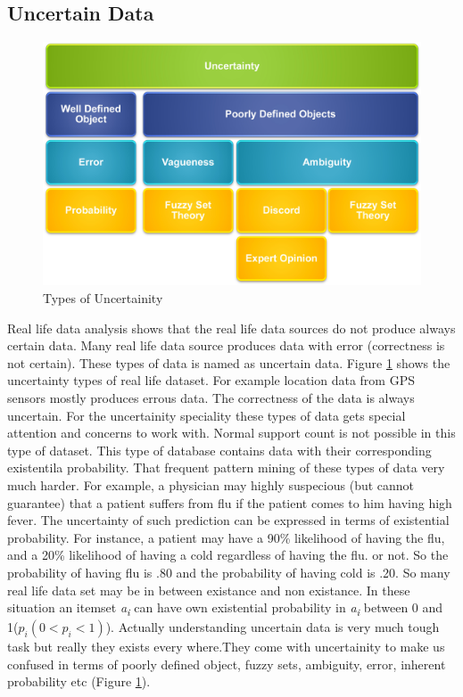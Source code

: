 \subsection{Uncertain Data}
\begin{figure}
\centering
  \includegraphics[width=.9\textwidth]{images/uncertainity_type.jpg}
\caption{Types of Uncertainity}
\label{figure:uncertainity_type}
\end{figure}
Real life data analysis shows that the real life data sources do not produce always certain data. Many real life data source produces data with error (correctness is not certain). These types of data is named as uncertain data. Figure \ref{figure:uncertainity_type} shows the uncertainty types of real life dataset. For example location data from GPS sensors mostly produces errous data. The correctness of the data is always uncertain. For the uncertainity speciality these types of data gets special attention and concerns to work with. Normal support count is not possible in this type of dataset. This type of database contains data with their corresponding existentila probability. That frequent pattern mining of these types of data very much harder. For example, a physician may highly suspecious (but cannot guarantee) that a patient suffers from flu if the patient comes to him having high fever. The uncertainty of such prediction can be expressed in terms of existential probability. For instance, a patient may have a 90\% likelihood of having the flu, and a 20\% likelihood of having a cold regardless of having the flu. or not. So the probability of having flu is .80 and the probability of having cold is .20. So many real life data set may be in between existance and non existance. In these situation an itemset \emph{a\textsubscript{i}} can have own existential probability in \emph{a\textsubscript{i}} between 0 and 1($p_i(0<p_i<1)$). Actually understanding uncertain data is very much tough task but really they exists every where.They come with uncertainity to make us confused in terms of poorly defined object, fuzzy sets, ambiguity, error, inherent probability etc (Figure \ref{figure:uncertainity_type}).\\
